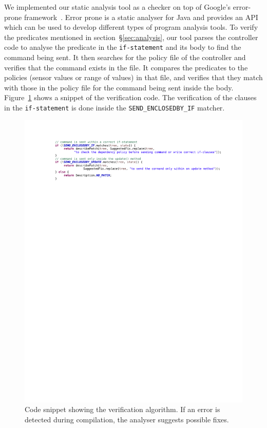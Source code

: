 \documentclass{article}
\begin{document}
We implemented our static analysis tool as a checker on top of Google's error-prone framework~\cite{errorprone}. Error prone is a static analyser for Java and provides an API which can be used to develop different types of program analysis tools. 
To verify the predicates mentioned in section~\S\ref{sec:analysis}, our tool parses the controller code to analyse the predicate in the \texttt{if-statement} and its body to find the command being sent. It then searches for the policy file  of the controller and verifies that the command exists in the file. It compares the predicates to the policies (sensor values or range of values) in that file, and verifies that they match with those in the policy file for the command being sent inside the body. Figure~\ref{fig:verify1} shows a snippet of the verification code. The verification of the clauses in the \texttt{if-statement} is done inside the \texttt{SEND\_ENCLOSEDBY\_IF} matcher.
\begin{figure}[h]
\begin{center}
\includegraphics[scale=0.7, trim = 0 22cm 0 2cm]{verify1.pdf}
\caption{Code snippet showing the verification algorithm. If an error is detected during compilation, the analyser suggests possible fixes. }
\label{fig:verify1}
\end{center}
\end{figure}
\end{document}
